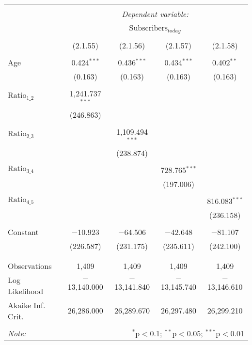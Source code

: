 
\begin{tabular}{@{\extracolsep{5pt}}lcccc}
\\[-1.8ex]\hline
\hline \\[-1.8ex]
 & \multicolumn{4}{c}{\textit{Dependent variable:}} \\
\cline{2-5}
\\[-1.8ex] & \multicolumn{4}{c}{$\text{Subscribers}_{today}$} \\
\\[-1.8ex] & (2.1.55) & (2.1.56) & (2.1.57) & (2.1.58)\\ 
\hline \\[-1.8ex]
 Age & 0.424$^{***}$ & 0.436$^{***}$ & 0.434$^{***}$ & 0.402$^{**}$ \\
  & (0.163) & (0.163) & (0.163) & (0.163) \\
  & & & & \\
 $\text{Ratio}_{1\_2}$ & 1,241.737$^{***}$ &  &  &  \\
  & (246.863) &  &  &  \\
  & & & & \\
 $\text{Ratio}_{2\_3}$ &  & 1,109.494$^{***}$ &  &  \\
  &  & (238.874) &  &  \\
  & & & & \\
 $\text{Ratio}_{3\_4}$ &  &  & 728.765$^{***}$ &  \\
  &  &  & (197.006) &  \\
  & & & & \\
 $\text{Ratio}_{4\_5}$ &  &  &  & 816.083$^{***}$ \\
  &  &  &  & (236.158) \\
  & & & & \\
 Constant & $-$10.923 & $-$64.506 & $-$42.648 & $-$81.107 \\
  & (226.587) & (231.175) & (235.611) & (242.100) \\
  & & & & \\
\hline \\[-1.8ex]
Observations & 1,409 & 1,409 & 1,409 & 1,409 \\
Log Likelihood & $-$13,140.000 & $-$13,141.840 & $-$13,145.740 & $-$13,146.610 \\
Akaike Inf. Crit. & 26,286.000 & 26,289.670 & 26,297.480 & 26,299.210 \\
\hline
\hline \\[-1.8ex]
\textit{Note:}  & \multicolumn{4}{r}{$^{*}$p$<$0.1; $^{**}$p$<$0.05; $^{***}$p$<$0.01} \\
\end{tabular}
